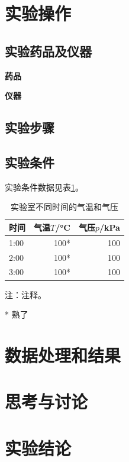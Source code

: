 \documentclass[UTF8]{article}
\begin{document}
	\section{实验操作}
	\subsection{实验药品及仪器}
	\textbf{药品} 
	
	\textbf{仪器} 
	
	\subsection{实验步骤}
	
	\subsection{实验条件}
	实验条件数据见表\ref{tiaojian}。
	
	\begin{table}[htp]
		\centering
		\begin{threeparttable}
			\caption{实验室不同时间的气温和气压}\label{tiaojian}
			\small %
			\begin{tabular} {lrr}
				\toprule
				时间 & 气温$T$/\si{\degreeCelsius} & 气压$p$/\si{kPa}  \\
				\midrule
				1:00 & 100* & 100 \\
				2:00 & 100* & 100 \\
				3:00 & 100* & 100 \\
				\bottomrule
			\end{tabular}
		注：注释。
		\begin{tablenotes}
			\item[*] 熟了
		\end{tablenotes}
		\end{threeparttable}
	\end{table}
	
	
	\section{数据处理和结果}
	
	
	
	\section{思考与讨论}
	
	
	
	\section{实验结论}
	

	
	
	


	
\end{document}
